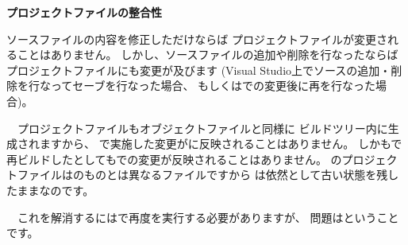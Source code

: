 \medskip
\noindent
\bf{\KLUDGE プロジェクトファイルの整合性}
\begin{narrow}[20pt]
	\KLUDGE ソースファイルの内容を修正しただけならば
	\KLUDGE プロジェクトファイルが変更されることはありません。
	\KLUDGE しかし、ソースファイルの追加や削除を行なったならば
	\KLUDGE プロジェクトファイルにも変更が及びます
	(Visual Studio\KLUDGE 上でソースの追加・削除を行なってセーブを行なった場合、
	\KLUDGE もしくは\KLUDGE での変更後に再\cmake \KLUDGE を行なった場合)\KLUDGE 。

	\KLUDGE 　プロジェクトファイルもオブジェクトファイルと同様に
	\KLUDGE ビルドツリー内に生成されますから、
	\KLUDGE で実施した変更が\KLUDGE に反映されることはありません。
	\KLUDGE しかも\KLUDGE で再ビルドしたとしても\KLUDGE での変更が反映されることはありません。
	\KLUDGE のプロジェクトファイルは\KLUDGE のものとは異なるファイルですから
	\KLUDGE は依然として古い状態を残したままなのです。

	\indent
	\KLUDGE 　これを解消するには\KLUDGE で再度\cmake \KLUDGE を実行する必要がありますが、
	\KLUDGE 問題は\KLUDGE ということです。
\end{narrow}

